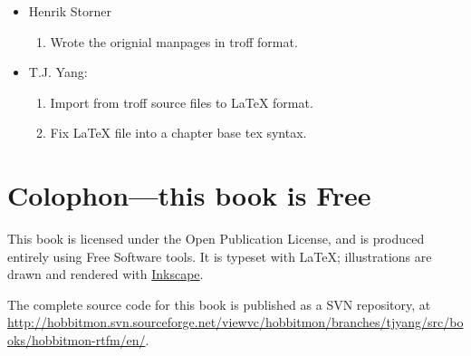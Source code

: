 \begin{itemize}
\item Henrik Storner
 \begin{enumerate}
  \item Wrote the orignial manpages in troff format.
 \end{enumerate}

\item T.J. Yang:
 \begin{enumerate}
  \item Import from troff source files to LaTeX format.
  \item Fix LaTeX file into a chapter base tex syntax.
 \end{enumerate}

\end{itemize}

\section{Colophon---this book is Free}

This book is licensed under the Open Publication License, and is
produced entirely using Free Software tools.  It is typeset with
\LaTeX{}; illustrations are drawn and rendered with
\href{http://www.inkscape.org/}{Inkscape}.

The complete source code for this book is published as a SVN
repository, at
\url{http://hobbitmon.svn.sourceforge.net/viewvc/hobbitmon/branches/tjyang/src/books/hobbitmon-rtfm/en/}.


